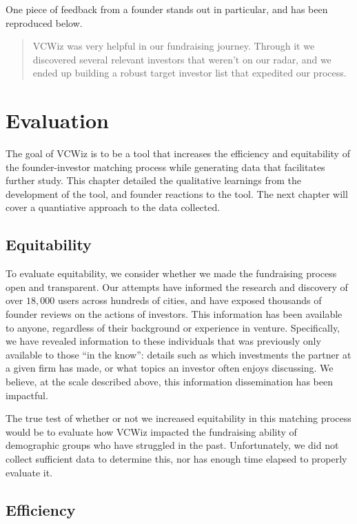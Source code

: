 One piece of feedback from a founder stands out in particular, and has been reproduced below.

\begin{quote}
VCWiz was very helpful in our fundraising journey. Through it we discovered several relevant investors that weren't on our radar, and we ended up building a robust target investor list that expedited our process.
\end{quote}

\section{Evaluation}

The goal of VCWiz is to be a tool that increases the efficiency and equitability of the founder-investor matching process while generating data that facilitates further study. This chapter detailed the qualitative learnings from the development of the tool, and founder reactions to the tool. The next chapter will cover a quantiative approach to the data collected.

\subsection{Equitability}

To evaluate equitability, we consider whether we made the fundraising process open and transparent. Our attempts have informed the research and discovery of over $18,000$ users across hundreds of cities, and have exposed thousands of founder reviews on the actions of investors. This information has been available to anyone, regardless of their background or experience in venture. Specifically, we have revealed information to these individuals that was previously only available to those ``in the know'': details such as which investments the partner at a given firm has made, or what topics an investor often enjoys discussing. We believe, at the scale described above, this information dissemination has been impactful.

The true test of whether or not we increased equitability in this matching process would be to evaluate how VCWiz impacted the fundraising ability of demographic groups who have struggled in the past. Unfortunately, we did not collect sufficient data to determine this, nor has enough time elapsed to properly evaluate it.

\subsection{Efficiency}

